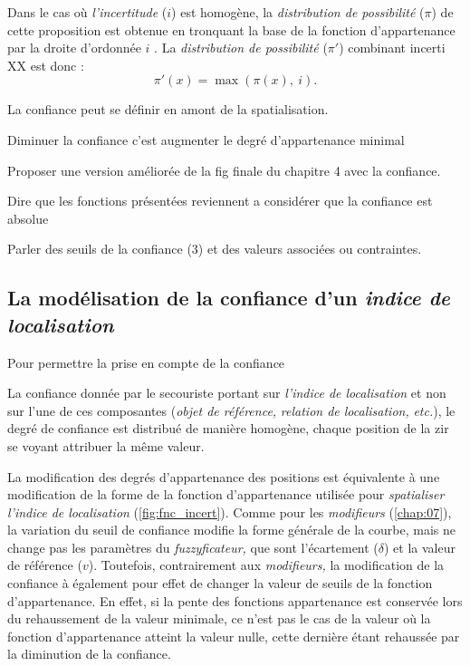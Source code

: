 Dans le cas où \emph{l'incertitude} (\(i\)) est homogène, la
\emph{distribution de possibilité} (\(π\)) de cette proposition est
obtenue en tronquant la base de la fonction d'appartenance par la
droite d'ordonnée \(i\) \autocite{Bouchon-Meunier2007}. La
\emph{distribution de possibilité} (\(π'\)) combinant incerti XX est
donc :
%
\begin{equation}
  π'(x) = \max(π(x),\ i).  
\end{equation}


La confiance peut se définir en amont de la spatialisation.

Diminuer la confiance c'est augmenter le degré d'appartenance minimal

Proposer une version améliorée de la fig finale du chapitre 4 avec la
confiance.

Dire que les fonctions présentées reviennent a considérer que la
confiance est absolue

Parler des seuils de la confiance (3) et des valeurs associées ou
contraintes.


\subsection{La modélisation de la confiance d'un \emph{indice de
    localisation}}

Pour permettre la prise en compte de la confiance


La confiance donnée par le secouriste portant sur \emph{l'indice de
  localisation} et non sur l'une de ces composantes (\eg \emph{objet
  de référence,} \emph{relation de localisation,} \emph{etc.}), le
degré de confiance est distribué de manière homogène, chaque position
de la \ac{zir} se voyant attribuer la même valeur.


La modification des degrés d'appartenance des positions est
équivalente à une modification de la forme de la fonction
d'appartenance utilisée pour \emph{spatialiser l'indice de
  localisation} (\autoref{fig:fnc_incert}). Comme pour les
\emph{modifieurs} (\autoref{chap:07}), la variation du seuil de
confiance modifie la forme générale de la courbe, mais ne change pas
les paramètres du \emph{fuzzyficateur,} que sont l'écartement
(\(\delta\)) et la valeur de référence (\(v\)). Toutefois,
contrairement aux \emph{modifieurs,} la modification de la confiance à
également pour effet de changer la valeur de seuils de la fonction
d'appartenance. En effet, si la pente des fonctions appartenance est
conservée lors du rehaussement de la valeur minimale, ce n'est pas le
cas de la valeur où la fonction d'appartenance atteint la valeur
nulle, cette dernière étant rehaussée par la diminution de la
confiance.

